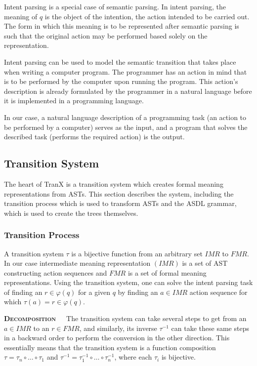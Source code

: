 Intent parsing is a special case of semantic parsing. In intent parsing,
the meaning of \(q\) is the object of the intention, the action intended
to be carried out. The form in which this meaning is to be represented
after semantic parsing is such that the original action may be performed
based solely on the representation.

Intent parsing can be used to model the semantic transition that takes
place when writing a computer program. The programmer has an action in
mind that is to be performed by the computer upon running the program.
This action's description is already formulated by the programmer in a
natural language before it is implemented in a programming language.

In our case, a natural language description of a programming task
(an action to be performed by a computer) serves as the input, and
a program that solves the described task (performs the required
action) is the output.

\subsection{Transition System}

The heart of TranX is a transition system which creates formal meaning
representations from ASTs. This section describes the system, including
the transition process which is used to transform ASTs and the ASDL
grammar, which is used to create the trees themselves.

\subsubsection{Transition Process}

A transition system \(\tau\) is a bijective function from an arbitrary set
\(IMR\) to \(FMR\). In our case intermediate meaning representation
\((IMR)\) is a set of AST constructing action sequences and \(FMR\)
is a set of formal meaning representations. Using the transition system,
one can solve the intent parsing task of finding an \(r \in \varphi(q)\)
for a given \(q\) by finding an \(a \in IMR\) action sequence for which
\(\tau(a) = r \in \varphi(q)\). 

\textbf{\textsc{Decomposition}}\ \ \ The transition system can take
several steps to get from an \(a \in IMR\) to an \(r \in FMR\), and
similarly, its inverse \(\tau^{-1}\) can take these same steps in a
backward order to perform the conversion in the other direction.
This essentially means that the transition system is a function composition
\(\tau = \tau_{n} \circ \dots \circ \tau_{1}\) and \(\tau^{-1} = 
\tau_{1}^{-1} \circ \dots \circ \tau_{n}^{-1}\), where each \(\tau_{i}\)
is bijective.

